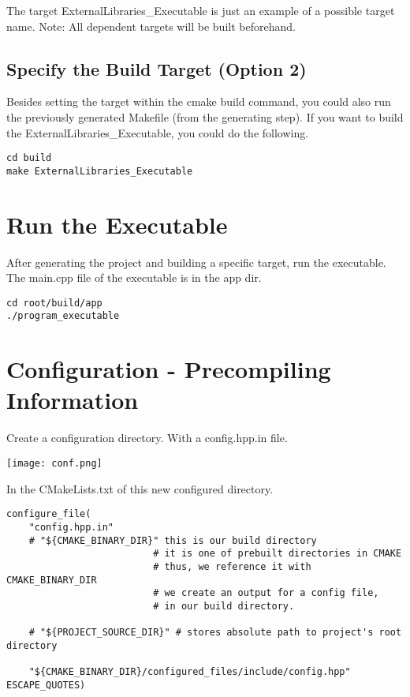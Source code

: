 \documentclass[openany]{report}
\begin{document}
The target ExternalLibraries\_Executable is just an example of a possible target name.
Note: All dependent targets will be built beforehand.

\subsection{Specify the Build Target (Option 2)}

Besides setting the target within the cmake build command, you could also run the previously generated Makefile (from the generating step).
If you want to build the ExternalLibraries\_Executable, you could do the following.

\begin{verbatim}
cd build
make ExternalLibraries_Executable
\end{verbatim}

\section{Run the Executable}

After generating the project and building a specific target, run the executable.
The main.cpp file of the executable is in the app dir. 

\begin{verbatim}
cd root/build/app
./program_executable
\end{verbatim}

\section{Configuration - Precompiling Information}

Create a configuration directory. With a config.hpp.in file.

\begin{center}
    \texttt{[image: conf.png]}
\end{center}

In the CMakeLists.txt of this new configured directory.

\begin{verbatim}
configure_file(
    "config.hpp.in"
    # "${CMAKE_BINARY_DIR}" this is our build directory
                          # it is one of prebuilt directories in CMAKE
                          # thus, we reference it with CMAKE_BINARY_DIR
                          # we create an output for a config file, 
                          # in our build directory.

    # "${PROJECT_SOURCE_DIR}" # stores absolute path to project's root directory

    "${CMAKE_BINARY_DIR}/configured_files/include/config.hpp" ESCAPE_QUOTES)
\end{verbatim}
\end{document}
